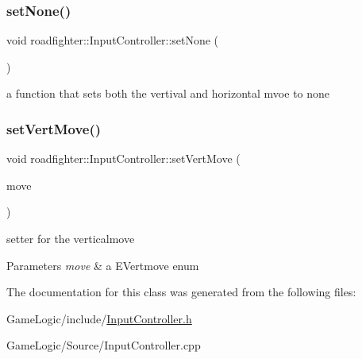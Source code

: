 \subsubsection{\texorpdfstring{set\+None()}{setNone()}}
{\footnotesize\ttfamily void roadfighter\+::\+Input\+Controller\+::set\+None (\begin{DoxyParamCaption}{ }\end{DoxyParamCaption})}

a function that sets both the vertival and horizontal mvoe to none \mbox{\label{classroadfighter_1_1InputController_a02d3a5d5c84eee14ff52adb92d4367cb}} 
\subsubsection{\texorpdfstring{set\+Vert\+Move()}{setVertMove()}}
{\footnotesize\ttfamily void roadfighter\+::\+Input\+Controller\+::set\+Vert\+Move (\begin{DoxyParamCaption}\item[{E\+Vert\+Move}]{move }\end{DoxyParamCaption})}

setter for the verticalmove 
\begin{DoxyParams}{Parameters}
{\em move} & a E\+Vertmove enum \\
\hline
\end{DoxyParams}


The documentation for this class was generated from the following files\+:\begin{DoxyCompactItemize}
\item 
Game\+Logic/include/\hyperlink{InputController_8h}{Input\+Controller.\+h}\item 
Game\+Logic/\+Source/Input\+Controller.\+cpp\end{DoxyCompactItemize}
